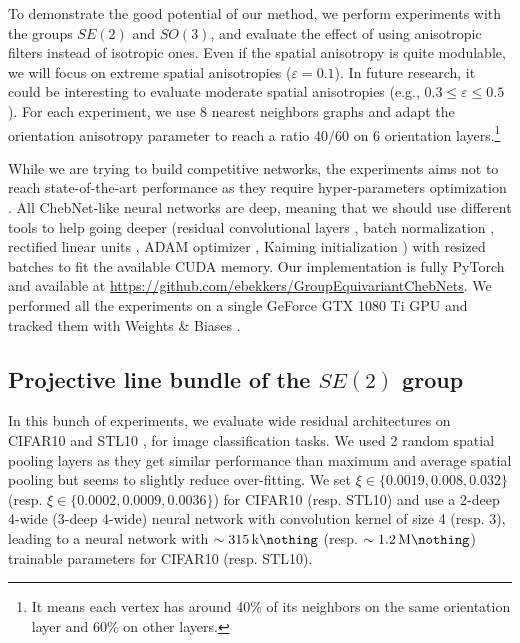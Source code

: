 \documentclass{article}
\begin{document}
To demonstrate the good potential of our method, we perform experiments with the groups $SE(2)$ and $SO(3)$, and evaluate the effect of using anisotropic filters instead of isotropic ones. Even if the spatial anisotropy is quite modulable, we will focus on extreme spatial anisotropies ($\varepsilon = 0.1$). In future research, it could be interesting to evaluate moderate spatial anisotropies (e.g., $0.3 \leq \varepsilon \leq 0.5$). For each experiment, we use 8 nearest neighbors graphs and adapt the orientation anisotropy parameter to reach a ratio 40/60 on 6 orientation layers.\footnote{It means each vertex has around 40\% of its neighbors on the same orientation layer and 60\% on other layers.} 

While we are trying to build competitive networks, the experiments aims not to reach state-of-the-art performance as they require hyper-parameters optimization \citep{yu2020hyper}. All ChebNet-like neural networks are deep, meaning that we should use different tools to help going deeper (residual convolutional layers \citep{he2016deep}, batch normalization \citep{ioffe2015batch}, rectified linear units \citep{nair2010rectified}, ADAM optimizer \citep{kingma2014adam},  Kaiming initialization \citep{he2015delving}) with resized batches to fit the available CUDA memory. Our implementation is fully PyTorch \citep{pytorch} and available at \url{https://github.com/ebekkers/GroupEquivariantChebNets}. We performed all the experiments on a single GeForce GTX 1080 Ti GPU and tracked them with Weights \& Biases \citep{wandb}. 

\subsection{Projective line bundle of the $SE(2)$ group}

In this bunch of experiments, we evaluate wide residual architectures \citep{zagoruyko2016wide} on CIFAR10 \citep{krizhevsky2009learning} and STL10 \citep{coates2011analysis}, for image classification tasks. We used 2 random spatial pooling layers as they get similar performance than maximum and average spatial pooling but seems to slightly reduce over-fitting. We set $\xi \in \{0.0019, 0.008, 0.032\}$ (resp. $\xi \in \{0.0002, 0.0009, 0.0036\}$) for CIFAR10 (resp. STL10) and use a 2-deep 4-wide (3-deep 4-wide) neural network with convolution kernel of size 4 (resp. 3), leading to a neural network with $\sim \SI{315}{\kilo\nothing}$ (resp. $\sim \SI{1.2}{\mega\nothing}$) trainable parameters for CIFAR10 (resp. STL10).
\end{document}
